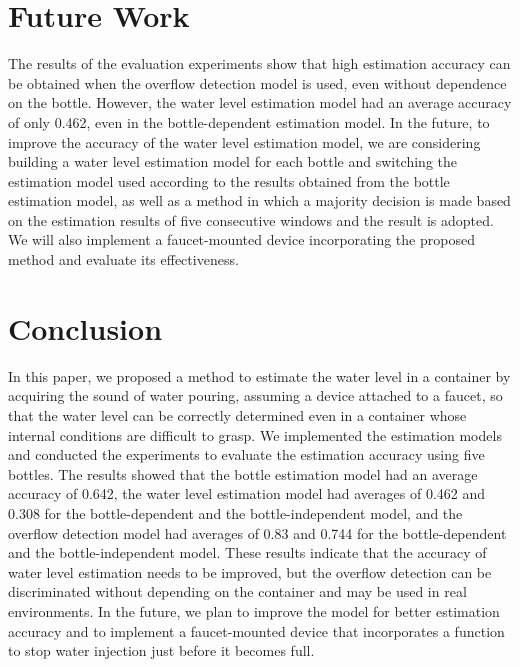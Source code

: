 \documentclass[sigconf]{acmart}
\begin{document}
\section{Future Work}
\label{sec:future_work}
The results of the evaluation experiments show that high estimation accuracy can be obtained when the overflow detection model is used, even without dependence on the bottle. However, the water level estimation model had an average accuracy of only 0.462, even in the bottle-dependent estimation model. In the future, to improve the accuracy of the water level estimation model, we are considering building a water level estimation model for each bottle and switching the estimation model used according to the results obtained from the bottle estimation model, as well as a method in which a majority decision is made based on the estimation results of five consecutive windows and the result is adopted. We will also implement a faucet-mounted device incorporating the proposed method and evaluate its effectiveness.



\section{Conclusion}
\label{sec:conclution}
In this paper, we proposed a method to estimate the water level in a container by acquiring the sound of water pouring, assuming a device attached to a faucet, so that the water level can be correctly determined even in a container whose internal conditions are difficult to grasp. We implemented the estimation models and conducted the experiments to evaluate the estimation accuracy using five bottles. The results showed that the bottle estimation model had an average accuracy of 0.642, the water level estimation model had averages of 0.462 and 0.308 for the bottle-dependent and the bottle-independent model, and the overflow detection model had averages of 0.83 and 0.744 for the bottle-dependent and the bottle-independent model. These results indicate that the accuracy of water level estimation needs to be improved, but the overflow detection can be discriminated without depending on the container and may be used in real environments. In the future, we plan to improve the model for better estimation accuracy and to implement a faucet-mounted device that incorporates a function to stop water injection just before it becomes full.





\end{document}
